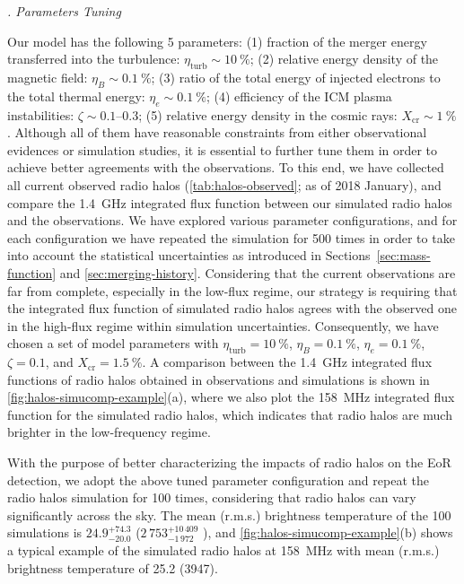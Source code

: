 \documentclass[modern]{aastex62}
\newcommand{\R}[1]{\mathrm{#1}}
\newcounter{sssseccount}
\newcommand{\sssseclabel}{\alph{sssseccount}}
\newcommand{\ssssec}[1]{%
  \vspace{1ex}%
  \stepcounter{sssseccount}%
  \noindent\emph{\sssseclabel. #1}%
}
\begin{document}
\ssssec{Parameters Tuning}

Our model has the following 5 parameters:
(1) fraction of the merger energy transferred into the turbulence:
$\eta_{\R{turb}} \sim \SI{10}{\percent}$;
(2) relative energy density of the magnetic field:
$\eta_B \sim \SI{0.1}{\percent}$;
(3) ratio of the total energy of injected electrons to the total thermal
energy: $\eta_e \sim \SI{0.1}{\percent}$;
(4) efficiency of the ICM plasma instabilities:
$\zeta \sim \numrange{0.1}{0.3}$;
(5) relative energy density in the cosmic rays:
$X_{\R{cr}} \sim \SI{1}{\percent}$.
Although all of them have reasonable constraints from either observational
evidences or simulation studies, it is essential to further tune them in
order to achieve better agreements with the observations.
To this end, we have collected all current observed radio halos
(\autoref{tab:halos-observed}; as of 2018 January), and compare the
\SI{1.4}{\GHz} integrated flux function between our simulated radio halos
and the observations.  We have explored various parameter configurations,
and for each configuration we have repeated the simulation for 500 times
in order to take into account the statistical uncertainties as introduced
in Sections~\ref{sec:mass-function} and \ref{sec:merging-history}.
Considering that the current observations are far from complete,
especially in the low-flux regime, our strategy is requiring that the
integrated flux function of simulated radio halos agrees with the observed
one in the high-flux regime within simulation uncertainties.
Consequently, we have chosen a set of model parameters with
$\eta_{\R{turb}} = \SI{10}{\percent}$, $\eta_B = \SI{0.1}{\percent}$,
$\eta_e = \SI{0.1}{\percent}$, $\zeta = 0.1$,
and $X_{\R{cr}} = \SI{1.5}{\percent}$.
A comparison between the \SI{1.4}{\GHz} integrated flux functions of
radio halos obtained in observations and simulations is shown in
\autoref{fig:halos-simucomp-example}(a),
where we also plot the \SI{158}{\MHz} integrated flux function for the
simulated radio halos, which indicates that radio halos are much brighter
in the low-frequency regime.

With the purpose of better characterizing the impacts of radio halos
on the EoR detection, we adopt the above tuned parameter configuration
and repeat the radio halos simulation for 100 times, considering that
radio halos can vary significantly across the sky.
The mean (r.m.s.) brightness temperature of the 100 simulations is
$24.9_{-20.0}^{+74.3}$ \si{\mK} ($2\,753_{-1\,972}^{+10\,409}$ \si{\mK}),
and \autoref{fig:halos-simucomp-example}(b) shows a typical example
of the simulated radio halos at \SI{158}{\MHz} with mean (r.m.s.)
brightness temperature of \SI{25.2}{\mK} (\SI{3947}{\mK}).
\end{document}
